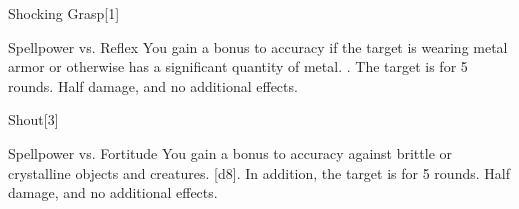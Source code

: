 \begin{spellsection}{Shocking Grasp}[1]
    \begin{spellheader}
    \end{spellheader}
    \begin{spellcontent}
        \begin{spelltargetinginfo}
        \end{spelltargetinginfo}
        \begin{spelleffects}
            \begin{spellattack}{Spellpower vs. Reflex}
                \spellspecial You gain a  bonus to accuracy if the target is wearing metal armor or otherwise has a significant quantity of metal.
                \spellsuccess {}.
                \spellcritical The target is \staggered for 5 rounds.
                \spellfailure Half damage, and no additional effects.
            \end{spellattack}
        \end{spelleffects}
    \end{spellcontent}
    \begin{spellfooter}
        \miscastexplode
    \end{spellfooter}
\end{spellsection}

\begin{spellsection}{Shout}[3]
    \begin{spellheader}
    \end{spellheader}
    \begin{spellcontent}
        \begin{spelltargetinginfo}
        \end{spelltargetinginfo}
        \begin{spelleffects}
            \begin{spellattack}{Spellpower vs. Fortitude}
                \spellspecial You gain a  bonus to accuracy against brittle or crystalline objects and creatures.
                \spellsuccess {}[d8]. In addition, the target is \deafened for 5 rounds.
                \spellfailure Half damage, and no additional effects.
            \end{spellattack}
        \end{spelleffects}
    \end{spellcontent}
    \begin{spellfooter}
        \miscastexplode
    \end{spellfooter}
\end{spellsection}

